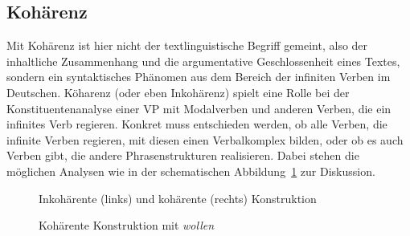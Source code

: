 \subsection{Kohärenz}

\label{sec:kohaerenz}


Mit Kohärenz ist hier nicht der textlinguistische Begriff gemeint, also der inhaltliche Zusammenhang und die argumentative Geschlossenheit eines Textes, sondern ein syntaktisches Phänomen aus dem Bereich der infiniten Verben im Deutschen.
Köharenz (oder eben Inkohärenz) spielt eine Rolle bei der Konstituentenanalyse einer VP mit Modalverben und anderen Verben, die ein infinites Verb regieren.
Konkret muss entschieden werden, ob alle Verben, die infinite Verben regieren, mit diesen einen Verbalkomplex bilden, oder ob es auch Verben gibt, die andere Phrasenstrukturen realisieren.
Dabei stehen die möglichen Analysen wie in der schematischen Abbildung~\ref{fig:hypkohinkoh} zur Diskussion.

\begin{figure}
  \hspace{1cm}
  \vspace{0.5cm}
  \caption[Inkohärente und kohärente Konstruktion]{Inkohärente (links) und kohärente (rechts) Konstruktion}
  \label{fig:hypkohinkoh}
\end{figure}

\begin{figure}
  \caption{Kohärente Konstruktion mit \textit{wollen}}
  \label{fig:hypkoh}
\end{figure}

